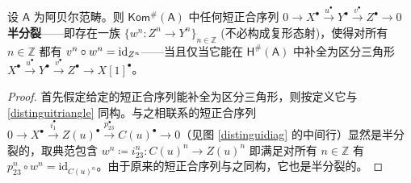 \begin{Lem}\label{semisplit}
	设 $\mathsf{A}$ 为阿贝尔范畴。则 $\mathsf{Kom^\#\!(A)}$ 中任何短正合序列 $0\rightarrow X^\bullet\xrightarrow{u^\bullet} Y^\bullet\xrightarrow{v^\bullet} Z^\bullet\rightarrow 0$ \textbf{半分裂}——即存在一族 $\{w^n:Z^n\rightarrow Y^n\}_{n\in\mathbb{Z}}$ \textup(不必构成复形态射\textup)，使得对所有 $n\in\mathbb{Z}$ 都有 $v^n\circ w^n=\textup{id}_{Z^n}$——当且仅当它能在 $\mathsf{H^\#\!(A)}$ 中补全为区分三角形 $X^\bullet\xrightarrow{u^\bullet} Y^\bullet\xrightarrow{v^\bullet} Z^\bullet\rightarrow X[1]^\bullet$。
\end{Lem}

\begin{proof}
	首先假定给定的短正合序列能补全为区分三角形，则按定义它与 \eqref{distinguitriangle} 同构。与之相联系的短正合序列 $0\rightarrow X^\bullet\xrightarrow{i_1^\bullet}Z(u)^\bullet\xrightarrow{p_{23}^\bullet}C(u)^\bullet\rightarrow 0$（见图 \eqref{distinguidiag} 的中间行）显然是半分裂的，取典范包含 $w^n\coloneqq i_{23}^n:C(u)^n\rightarrow Z(u)^n$ 即满足对所有 $n\in\mathbb{Z}$ 有 $p_{23}^n\circ w^n=\text{id}_{C(u)^n}$。由于原来的短正合序列与之同构，它也是半分裂的。
	

\end{proof}
